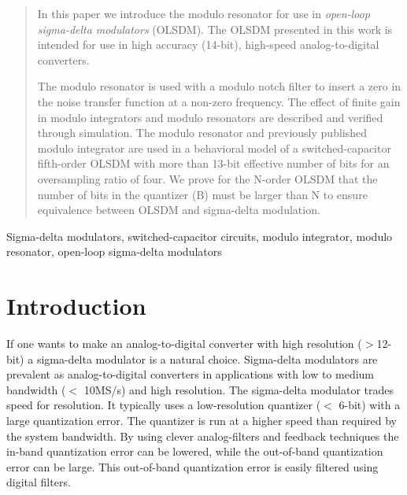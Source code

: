

\newcommand{\simulink}{Simulink  }
\newcommand{\matlab}{MATLAB }
\begin{abstract}
In this paper we introduce the modulo resonator for use in \textit{open-loop
sigma-delta modulators} (OLSDM). The OLSDM presented in this work is
intended for use in high accuracy (14-bit), high-speed analog-to-digital
converters.

The modulo resonator is used with a modulo notch filter to
insert a zero in the noise transfer function at a non-zero
frequency. 
The effect of finite gain in modulo integrators and modulo resonators
are described and verified through simulation. 
The modulo resonator and previously published modulo
integrator are used in a behavioral model of a switched-capacitor fifth-order OLSDM with more
than 13-bit effective number of bits for an oversampling ratio of
four. We prove for
the N-order OLSDM that the number of bits in the quantizer (B) must be
larger than N to ensure equivalence between OLSDM and sigma-delta
modulation.
\end{abstract}

\begin{keywords}
Sigma-delta modulators, switched-capacitor circuits, modulo
integrator, modulo resonator, open-loop sigma-delta modulators
\end{keywords}

\section{Introduction}
If one wants to make an analog-to-digital converter with high
resolution ($>$12-bit) a sigma-delta modulator is a natural choice. 
Sigma-delta modulators are prevalent as analog-to-digital converters in applications with low to medium
bandwidth  ($<$ 10MS/s) and high resolution.  
The sigma-delta modulator trades speed for resolution.
It typically uses a low-resolution quantizer ($<$
6-bit) with a large quantization error. The quantizer is run at a
higher speed than required by the system bandwidth. By using clever
analog-filters and feedback techniques the in-band quantization error can be
lowered, while the out-of-band quantization error can be large. This
out-of-band quantization error is easily filtered using digital
filters. 

